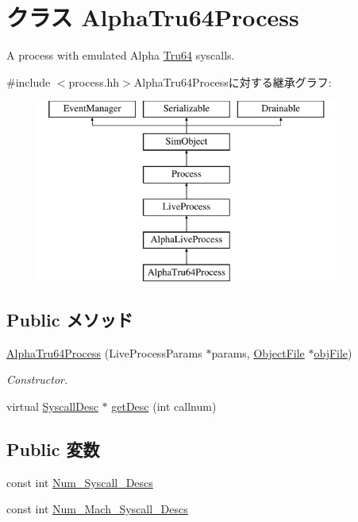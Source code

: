 \hypertarget{classAlphaISA_1_1AlphaTru64Process}{
\section{クラス AlphaTru64Process}
\label{classAlphaISA_1_1AlphaTru64Process}
}


A process with emulated Alpha \hyperlink{classTru64}{Tru64} syscalls.  


{\ttfamily \#include $<$process.hh$>$}AlphaTru64Processに対する継承グラフ:\begin{figure}[H]
\begin{center}
\leavevmode
\includegraphics[height=6cm]{classAlphaISA_1_1AlphaTru64Process}
\end{center}
\end{figure}
\subsection*{Public メソッド}
\begin{DoxyCompactItemize}
\item 
\hyperlink{classAlphaISA_1_1AlphaTru64Process_ab52e01bd8111d3d5aff45bdf7027d869}{AlphaTru64Process} (LiveProcessParams $\ast$params, \hyperlink{classObjectFile}{ObjectFile} $\ast$\hyperlink{classLiveProcess_ab6cfcfa7903c66267b3e0351c3caa809}{objFile})
\begin{DoxyCompactList}\small\item\em Constructor. \item\end{DoxyCompactList}\item 
virtual \hyperlink{classSyscallDesc}{SyscallDesc} $\ast$ \hyperlink{classAlphaISA_1_1AlphaTru64Process_aebbff609a7235342925445690acf5ee8}{getDesc} (int callnum)
\end{DoxyCompactItemize}
\subsection*{Public 変数}
\begin{DoxyCompactItemize}
\item 
const int \hyperlink{classAlphaISA_1_1AlphaTru64Process_a9534988905c6f5c8c57c4b6a7b179fea}{Num\_\-Syscall\_\-Descs}
\item 
const int \hyperlink{classAlphaISA_1_1AlphaTru64Process_a268ff6f294759681a7cbaa847d129e15}{Num\_\-Mach\_\-Syscall\_\-Descs}
\end{DoxyCompactItemize}
